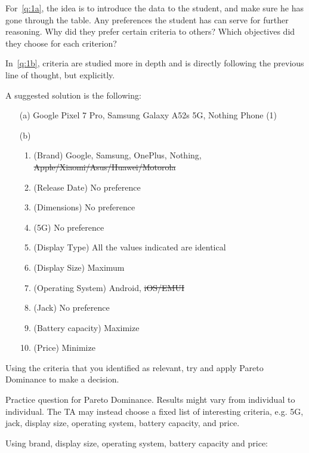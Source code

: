 \documentclass[answers, 10pt, UKenglish]{exam}
\begin{document}
\begin{questions}
\begin{solutionorbox}
{		For~\cref{q:1a}, the idea is to introduce the data to the 
		student, and make sure he has gone through the table. Any preferences
		the student has can serve for further reasoning. Why did they prefer
		certain criteria to others? Which objectives did they choose for each
		criterion?

		In~\cref{q:1b}, criteria are studied more in depth and is directly
		following the previous line of thought, but explicitly.

		A suggested solution is the following:

		\begin{enumerate}
			\item[(a)] Google Pixel 7 Pro, Samsung Galaxy A52s 5G, Nothing Phone (1)
			\item [(b)] \begin{enumerate}
				\item (Brand) Google, Samsung, OnePlus, Nothing, \sout{Apple/Xiaomi/Asus/Huawei/Motorola}
				\item (Release Date) No preference
				\item (Dimensions) No preference
				\item (5G) No preference
				\item (Display Type) All the values indicated are identical
				\item (Display Size) Maximum
				\item (Operating System) Android, \sout{iOS/EMUI}
				\item (Jack) No preference
				\item (Battery capacity) Maximize
				\item (Price) Minimize
			\end{enumerate}
		\end{enumerate}
	}
	\end{solutionorbox}
	
	\question
	Using the criteria that you identified as relevant, try and apply
	Pareto Dominance to make a decision.
	
	\begin{solutionorbox}
	{
		\color{red}
		Practice question for Pareto Dominance. Results might vary from
		individual to individual. The TA may instead choose a fixed
		list of  interesting criteria, e.g. 5G, jack, display size,
		operating system, battery capacity, and price.

		Using brand, display size, operating system, battery capacity and price:

}
\end{solutionorbox}
\end{questions}
\end{document}
